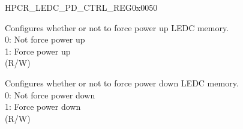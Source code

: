 \begin{register}{H}{PCR\_LEDC\_PD\_CTRL\_REG}{0x0050}\label{regdesc:PCRLEDCPDCTRLREG}
%
%
%
%
\regnewline%
\begin{regdesc}\begin{reglist}
\label{fielddesc:PCRLEDCMEMFORCEPU}\item [PCR\_LEDC\_MEM\_FORCE\_PU] Configures whether or not to force power up LEDC memory. \\
0: Not force power up \\
1: Force power up \\  (R/W)
\label{fielddesc:PCRLEDCMEMFORCEPD}\item [PCR\_LEDC\_MEM\_FORCE\_PD] Configures whether or not to force power down LEDC memory.\\
0: Not force power down \\
1: Force power down \\(R/W)
\end{reglist}\end{regdesc}
\end{register}


